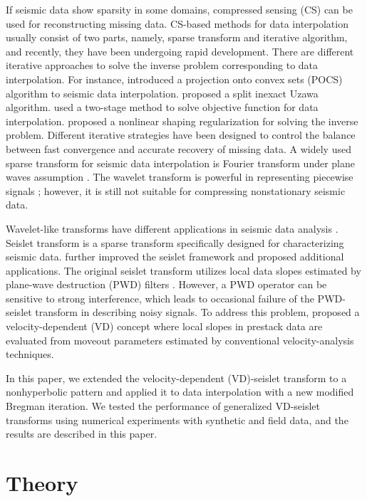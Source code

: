 If seismic data show sparsity in some domains, compressed sensing
(CS) \cite[]{Donoho06} can be used for reconstructing missing
data. CS-based methods for data interpolation usually consist of two
parts, namely, sparse transform and iterative algorithm, and recently,
they have been undergoing rapid development. There are different
iterative approaches to solve the inverse problem corresponding to
data interpolation. For instance, \cite{pocs} introduced a projection
onto convex sets (POCS) algorithm to seismic data
interpolation. \cite{Ma14} proposed a split inexact Uzawa
algorithm. \cite{Yu15} used a two-stage method to solve objective
function for data interpolation. \cite{Chen15} proposed a nonlinear
shaping regularization for solving the inverse problem. Different
iterative strategies have been designed to control the balance between
fast convergence and accurate recovery of missing data. A widely used
sparse transform for seismic data interpolation is Fourier transform
under plane waves assumption
\cite[]{antileak,frsi2,frsi3,Naghizadeh13}. The wavelet transform is
powerful in representing piecewise
signals \cite[]{mallat}; however, it is still not suitable for
compressing nonstationary seismic data.

Wavelet-like transforms have different applications in seismic data
analysis \cite[]{Herrmann08b,Wang15,Bobmann15}. Seislet
transform \cite[]{Fomel06} is a sparse transform specifically designed
for characterizing seismic data. \cite{Fomel10a} further improved the
seislet framework and proposed additional applications. The original
seislet transform utilizes local data slopes estimated by plane-wave
destruction (PWD) filters \cite[]{Fomel02,Chen13a,Chen13b}. However, a
PWD operator can be sensitive to strong interference, which leads to
occasional failure of the PWD-seislet transform in describing noisy
signals. To address this problem, \cite{Liu15} proposed a
velocity-dependent (VD) concept where local slopes in prestack data
are evaluated from moveout parameters estimated by conventional
velocity-analysis techniques.

In this paper, we extended the velocity-dependent (VD)-seislet
transform \cite[]{Liu15} to a nonhyperbolic pattern and applied it to
data interpolation with a new modified Bregman iteration. We tested
the performance of generalized VD-seislet transforms using numerical
experiments with synthetic and field data, and the results are
described in this paper.

\section{Theory}

